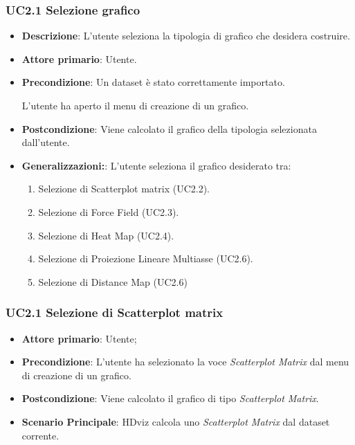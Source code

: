 \subsubsection{UC2.1 Selezione grafico}
\label{ssub:UC2.1}
\begin{itemize}

	\item \textbf{Descrizione}: L’utente seleziona la tipologia di grafico che desidera costruire.

    \item \textbf{Attore primario}: Utente.

	\item \textbf{Precondizione}:   Un dataset è stato correttamente importato. 

									L'utente ha aperto il menu di creazione di un grafico.

    \item \textbf{Postcondizione}:  Viene calcolato il grafico della tipologia selezionata dall'utente.

	\item \textbf{Generalizzazioni:}:  L'utente seleziona il grafico desiderato tra:

		\begin{enumerate}
			
			\item Selezione di Scatterplot matrix (UC2.2).
			\item Selezione di Force Field (UC2.3).
			\item Selezione di Heat Map (UC2.4).
			\item Selezione di Proiezione Lineare Multiasse (UC2.6).
			\item Selezione di Distance Map (UC2.6)
			
		\end{enumerate}

\end{itemize}


\subsubsection{UC2.1 Selezione di Scatterplot matrix}
\label{ssub:UC2.2}
\begin{itemize}

    \item \textbf{Attore primario}: Utente;

    \item \textbf{Precondizione}:   L'utente ha selezionato la voce \emph{Scatterplot Matrix} dal menu di creazione di un grafico.

    \item \textbf{Postcondizione}:  Viene calcolato il grafico di tipo \emph{Scatterplot Matrix}.

	\item \textbf{Scenario Principale}: HDviz calcola uno \emph{Scatterplot Matrix} dal dataset corrente.
\end{itemize}



